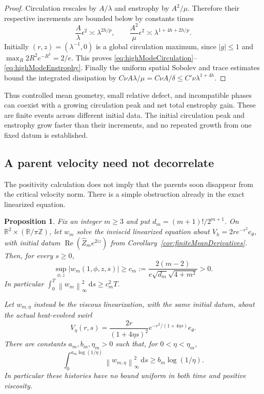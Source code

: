 \documentclass[11pt]{article}
\newtheorem{proposition}[theorem]{Proposition}
\theoremstyle{remark}
\newcommand{\R}{\mathbb R}
\newcommand{\dd}{\,\mathrm d}
\newcommand{\norm}[1]{\left\lVert#1\right\rVert}
\begin{document}
\begin{proof}
Circulation rescales by $A/\lambda$ and enstrophy by $A^2/\mu$.
Therefore their respective increments are bounded below by constants
times
\[
 \frac A\lambda\epsilon^2\asymp\lambda^{2h/p},\qquad
 \frac{A^2}{\mu}\epsilon^2\asymp\lambda^{1+4h+2h/p}.
\]
Initially $(r,z)=(\lambda^{-1},0)$ is a global circulation maximum,
since $|g|\leq1$ and $\max_R2R^2e^{-R^2}=2/e$.
This proves \eqref{eq:highModeCirculation}--\eqref{eq:highModeEnstrophy}.
Finally the uniform spatial Sobolev and trace estimates bound the
integrated dissipation by
$C\nu A\lambda/\mu=C\nu A/\delta\leq C'\nu\lambda^{1+4h}$.
\end{proof}

Thus controlled mean geometry, small relative defect, and incompatible
phases can coexist with a growing circulation peak and net total
enstrophy gain. These are finite events across different initial data.
The initial circulation peak and enstrophy grow faster than their
increments, and no repeated growth from one fixed datum is established.

\subsection{A parent velocity need not decorrelate}

The positivity calculation does not imply that the parents soon disappear
from the critical velocity norm. There is a simple obstruction already
in the exact linearized equation.

\begin{proposition}\label{prop:parentNondecay}
Fix an integer $m\geq3$ and put $d_m=(m+1)!/2^{m+1}$.
On $\R^2\times(\R/\pi\mathbb{Z})$, let $w_m$ solve the inviscid
linearized equation about $V_h=2r e^{-r^2}e_\theta$, with initial
datum $\operatorname{Re}(\widehat Z_m e^{2iz})$ from
Corollary~\ref{cor:finiteMeanDerivatives}. Then, for every $s\geq0$,
\begin{equation}\label{eq:parentNondecay}
 \sup_{\phi,z}|w_m(1,\phi,z,s)|\geq
 c_m:=\frac{2(m-2)}{e\sqrt{d_m}\sqrt{4+m^2}}>0.
\end{equation}
In particular $\int_0^T\norm{w_m}_\infty^2\dd s\geq c_m^2T$.

Let $w_{m,\eta}$ instead be the viscous linearization, with the same
initial datum, about the actual heat-evolved swirl
\[
 V_\eta(r,s)=\frac{2r}{(1+4\eta s)^2}
                 e^{-r^2/(1+4\eta s)}e_\theta.
\]
There are constants $a_m,b_m,\eta_m>0$ such that, for
$0<\eta<\eta_m$,
\begin{equation}\label{eq:viscousParentLogHistory}
 \int_0^{a_m\log(1/\eta)}\norm{w_{m,\eta}}_\infty^2\dd s
       \geq b_m\log(1/\eta).
\end{equation}
In particular these histories have no bound uniform in both time
and positive viscosity.
\end{proposition}
\end{document}
